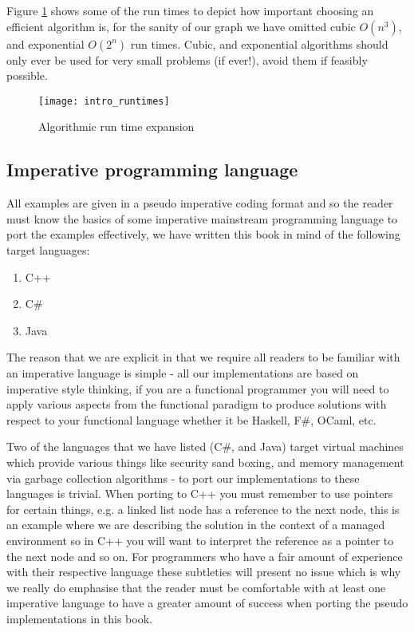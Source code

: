 Figure \ref{algorithmic_runtime_expansion} shows some of the run times to depict how important choosing an efficient algorithm is, for the sanity of our graph we have omitted cubic $O(n^{3})$, and exponential $O(2^{n})$ run times. Cubic, and exponential algorithms should only ever be used for very small problems (if ever!), avoid them if feasibly possible. 

\begin{figure}
\texttt{[image: intro\_runtimes]}
\caption{Algorithmic run time expansion} \label{algorithmic_runtime_expansion}
\end{figure}

\subsection{Imperative programming language}
All examples are given in a pseudo imperative coding format and so the reader must know the basics of some imperative mainstream programming language to port the examples effectively, we have written this book in mind of the following target languages:

\begin{enumerate}
\item C++
\item C\#
\item Java
\end{enumerate}

The reason that we are explicit in that we require all readers to be familiar with an imperative language is simple - all our implementations are based on imperative style thinking, if you are a functional programmer you will need to apply various aspects from the functional paradigm to produce solutions with respect to your functional language whether it be Haskell, F\#, OCaml, etc.


Two of the languages that we have listed (C\#, and Java) target virtual machines which provide various things like security sand boxing, and memory management via garbage collection algorithms - to port our implementations to these languages is trivial. When porting to C++ you must remember to use pointers for certain things, e.g. a linked list node has a reference to the next node, this is an example where we are describing the solution in the context of a managed environment so in C++ you will want to interpret the reference as a pointer to the next node and so on. For programmers who have a fair amount of experience with their respective language these subtleties will present no issue which is why we really do emphasise that the reader must be comfortable with at least one imperative language to have a greater amount of success when porting the pseudo implementations in this book.


